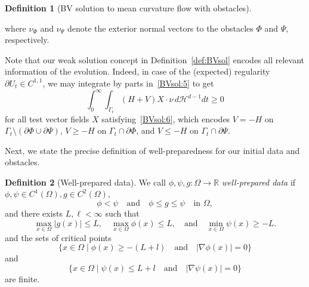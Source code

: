 \documentclass{amsart}
\theoremstyle{definition}
\newtheorem{definition}{Definition}[section]
\def\R{{\mathbb{R}}}
\begin{document}
\begin{definition}[BV solution to mean curvature flow with obstacles]
\begin{enumerate}[(i)]
where $\nu_\Phi$ and $\nu_\Psi$ denote the exterior normal vectors to the obstacles $\Phi$ and $\Psi$, respectively.
    \end{enumerate}
\end{definition}

    Note that our weak solution concept in Definition~\ref{def:BVsol} encodes all relevant information of the evolution. Indeed, in case of the (expected) regularity $\partial U_t \in C^{1,1}$, we may integrate by parts in~\eqref{BVsol:5} to get 
    \[    \int_0^{\infty} \int_{\Gamma_t} ( H + V ) X \cdot 
    \nu\, d\mathcal{H}^{d-1}dt \geq 0
    \]
    for all test vector fields $X$ satisfying~\eqref{BVsol:6},
    which encodes $V =-H$ on $\Gamma_t\setminus (\partial \Phi \cup \partial \Psi)
    $, $V\geq -H$ on $\Gamma_t \cap \partial \Phi$, and $V \leq -H$ on $\Gamma_t \cap \partial \Psi$.

Next, we state the precise definition of well-preparedness for our initial data and obstacles.
\begin{definition}[Well-prepared data]\label{def:well-prepared}
    We call $\phi,\psi,g\colon \Omega \to \R$ \emph{well-prepared data} if $\phi,\psi \in C^1 (\Omega), g \in C^2 (\Omega)$,
    \[
        \phi<\psi 
        \quad \text{and} \quad
        \phi \leq g \leq \psi \quad \text{in }\Omega,
    \]
    and there exists $L, \ell<\infty$ such that
    \begin{equation}\label{lem3.4:assumption1}
        \max_{x \in \Omega} |g(x)| \leq L,
        \quad 
        \max_{x \in \Omega} \phi (x) \leq L,
        \quad 
        \text{and} 
        \quad
        \min_{x \in \Omega} \psi (x) \geq -L.
    \end{equation}
    and the sets of critical points
    \[
        \{ x \in \Omega \mid \phi (x) \geq - (L+l) \quad \text{and} \quad
    |\nabla \phi (x)|=0 \}
    \]
    and
    \[
    \{ x \in \Omega \mid \psi (x) \leq L+l \quad \text{and} \quad
    |\nabla \psi (x)|=0 \}
    \]
    are finite.
\end{definition}
\end{document}
